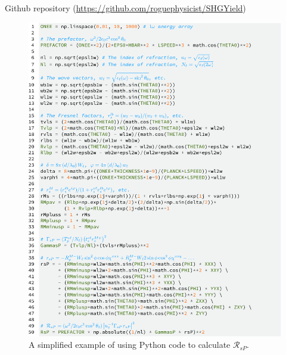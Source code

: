 Github repository (\url{https://github.com/roguephysicist/SHGYield})

\begin{figure}
\centering 
\includegraphics[scale=0.9]{content/figures/code-shgyield}
\caption{A simplified example of using Python code to calculate
$\mathcal{R}_{sP}$.}
\label{fig:code-shgyield}
\end{figure}


\stopcontents[chapters]

